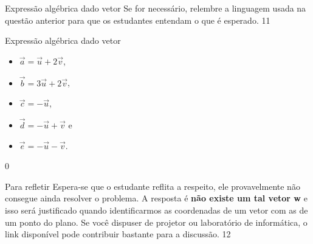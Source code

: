 \begin{sugestions}{Expressão algébrica dado vetor}
{
Se for necessário, relembre a linguagem usada na questão anterior para que os estudantes entendam o que é esperado.
}{1}{1}
\end{sugestions}
\begin{answer}{Expressão algébrica dado vetor}
{
\begin{itemize}
\item \(\vec{a}=\vec{u} + 2\vec{v}\),

\item \(\vec{b}=3\vec{u} + 2\vec{v}\),

\item \(\vec{c}=-\vec{u}\),

\item \(\vec{d}=-\vec{u} + \vec{v}\) e

\item \(\vec{e}=-\vec{u}-\vec{v}\).
\end{itemize}
}{0}
\end{answer}
\begin{sugestions}{Para refletir}
{
Espera-se que o estudante reflita a respeito, ele provavelmente não consegue ainda resolver o problema. A resposta é \textbf{não existe um tal vetor w} e isso será justificado quando identificarmos as coordenadas de um vetor com as de um ponto do plano. Se você dispuser de projetor ou laboratório de informática, o link disponível pode contribuir bastante para a discussão.
}{1}{2}
\end{sugestions}

